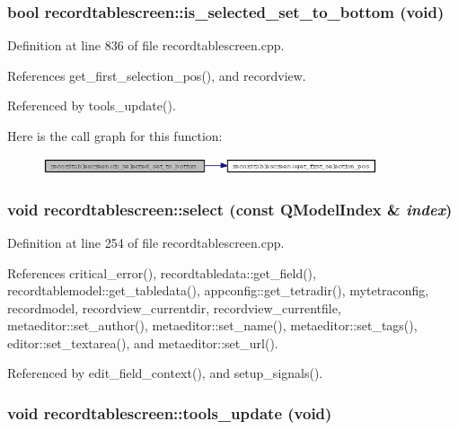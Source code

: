 \subsubsection{\setlength{\rightskip}{0pt plus 5cm}bool recordtablescreen::is\_\-selected\_\-set\_\-to\_\-bottom (void)}\label{classrecordtablescreen_c73f9f801e76c4cb83556dd1b99d8192}




Definition at line 836 of file recordtablescreen.cpp.

References get\_\-first\_\-selection\_\-pos(), and recordview.

Referenced by tools\_\-update().

Here is the call graph for this function:\begin{figure}[H]
\begin{center}
\leavevmode
\includegraphics[width=279pt]{classrecordtablescreen_c73f9f801e76c4cb83556dd1b99d8192_cgraph}
\end{center}
\end{figure}
\subsubsection{\setlength{\rightskip}{0pt plus 5cm}void recordtablescreen::select (const QModel\-Index \& {\em index})\hspace{0.3cm}{\tt  [private, slot]}}\label{classrecordtablescreen_55bc3b168d846297e2107ea29ee24f7a}




Definition at line 254 of file recordtablescreen.cpp.

References critical\_\-error(), recordtabledata::get\_\-field(), recordtablemodel::get\_\-tabledata(), appconfig::get\_\-tetradir(), mytetraconfig, recordmodel, recordview\_\-currentdir, recordview\_\-currentfile, metaeditor::set\_\-author(), metaeditor::set\_\-name(), metaeditor::set\_\-tags(), editor::set\_\-textarea(), and metaeditor::set\_\-url().

Referenced by edit\_\-field\_\-context(), and setup\_\-signals().
\subsubsection{\setlength{\rightskip}{0pt plus 5cm}void recordtablescreen::tools\_\-update (void)\hspace{0.3cm}{\tt  [private, slot]}}\label{classrecordtablescreen_a4b0a512d0caf52495f5cb2883fcb2f8}




